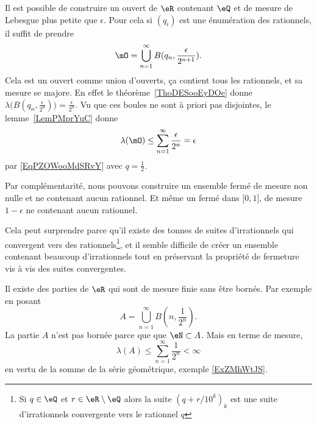 \begin{example}
    Il est possible de construire un ouvert de $\eR$ contenant \( \eQ\) et de mesure de Lebesgue plus petite que \( \epsilon\). Pour cela si \( (q_i)\) est une énumération des rationnels, il suffit de prendre
    \begin{equation}
        \mO=\bigcup_{n=1}^{\infty}B(q_n,\frac{ \epsilon }{ 2^{n+1} }).
    \end{equation}
    Cela est un ouvert comme union d'ouverts, ça contient tous les rationnels, et sa mesure se majore. En effet le théorème~\ref{ThoDESooEyDOe} donne \( \lambda\big( B(q_n,\frac{\epsilon }{ 2^n }) \big)=\frac{ \epsilon }{ 2^n }\). Vu que ces boules ne sont à priori pas disjointes, le lemme~\ref{LemPMprYuC} donne
    \begin{equation}
        \lambda(\mO) \leq \sum_{n=1}^{\infty}\frac{ \epsilon }{ 2^n }=\epsilon
    \end{equation}
    par \eqref{EqPZOWooMdSRvY} avec \( q=\frac{ 1 }{2}\).

    Par complémentarité, nous pouvons construire un ensemble fermé de mesure non nulle et ne contenant aucun rationnel. Et même un fermé dans \( \mathopen[ 0 , 1 \mathclose]\), de mesure \( 1-\epsilon\) ne contenant aucun rationnel.

    Cela peut surprendre parce qu'il existe des tonnes de suites d'irrationnels qui convergent vers des rationnels\footnote{Si \( q\in \eQ\) et \( r\in \eR\setminus \eQ\) alors la suite \( (q+r/10^k)_k\) est une suite d'irrationnels convergente vers le rationnel \( q\)}, et il semble difficile de créer un ensemble contenant beaucoup d'irrationnels tout en préservant la propriété de fermeture vis à vis des suites convergentes.
\end{example}

\begin{example}
    Il existe des parties de \( \eR\) qui sont de mesure finie sans être bornés. Par exemple en posant 
    \begin{equation}
        A=\bigcup_{n=1}^{\infty}B(n,\frac{1}{ 2^n }).
    \end{equation}
    La partie \( A\) n'est pas bornée parce que que \( \eN\subset A\). Mais en terme de mesure,
    \begin{equation}
        \lambda(A)\leq \sum_{n=1}^{\infty}\frac{1}{ 2^n }<\infty
    \end{equation}
    en vertu de la somme de la série géométrique, exemple \ref{ExZMhWtJS}.
\end{example}


